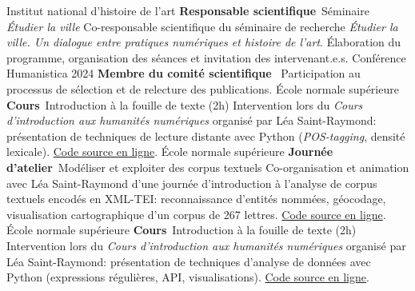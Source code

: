 	{%
		Institut national d'histoire de l'art}
	{%
		\textbf{Responsable scientifique}~Séminaire \textit{Étudier la ville}}
	{%
		Co-responsable scientifique du séminaire de recherche \textit{Étudier la ville. Un dialogue entre pratiques numériques et histoire de l'art}. Élaboration du programme, organisation des séances et invitation des intervenant.e.s.}
	{%
		Conférence Humanistica 2024}
	{%
		\textbf{Membre du comité scientifique}~}
	{%
		Participation au processus de sélection et de relecture des publications.}
	{%
		École normale supérieure}
	{%
		\textbf{Cours}~Introduction à la fouille de texte (2h)}
	{%
		Intervention lors du \textit{Cours d'introduction aux humanités numériques} organisé par Léa Saint-Raymond: présentation de techniques de lecture distante avec Python (\textit{POS-tagging}, densité lexicale). \href{https://github.com/paulhectork/cours_ens2024_fouille_de_texte.git}{Code source en ligne}.}
	{%
		École normale supérieure}
	{%
		\textbf{Journée d'atelier}~Modéliser et exploiter des corpus textuels}
	{%
		Co-organisation et animation avec Léa Saint-Raymond d'une journée d'introduction à l'analyse de corpus textuels encodés en XML-TEI: reconnaissance d'entités nommées, géocodage, visualisation cartographique d'un corpus de 267 lettres. \href{https://github.com/paulhectork/cours_ens2023_xmltei}{Code source en ligne}.}
	{%
		École normale supérieure}
	{%
		\textbf{Cours}~Introduction à la fouille de texte (2h)}
	{%
		Intervention lors du \textit{Cours d'introduction aux humanités numériques} organisé par Léa Saint-Raymond: présentation de techniques d'analyse de données avec Python (expressions régulières, API, visualisations). \href{https://github.com/paulhectork/cours_ens2024_fouille_de_texte.git}{Code source en ligne}.}

